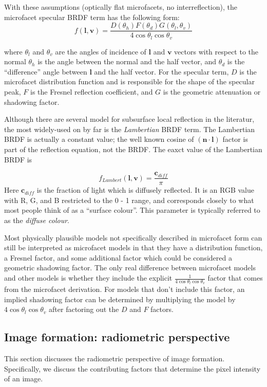 With these assumptions (optically flat microfacets, no interreflection), the microfacet specular BRDF term has the following form:
$$
f(\mathbf{l}, \mathbf{v}) = \frac{D(\theta_h)F(\theta_d)G(\theta_l, \theta_v)}{4\cos\theta_l\cos\theta_v}
$$

where $\theta_l$ and $\theta_v$ are the angles of incidence of $\mathbf{l}$ and $\mathbf{v}$ vectors with respect to the normal $\theta_h$ is the angle between the normal and the half vector, and $\theta_d$ is the ``difference'' angle between $\mathbf{l}$ and the half vector. For the specular term, $D$ is the microfacet distribution function and is responsible for the shape of the specular peak, $F$ is the Fresnel reflection coefficient, and $G$ is the geometric attenuation or shadowing factor.

Although there are several model for subsurface local reflection in the literatur, the most widely-used on by far is the \textit{Lambertian} BRDF term. The Lambertian BRDF is actually a constant value; the well known cosine of $(\mathbf{n}\cdot\mathbf{l})$ factor is part of the reflection equation, not the BRDF. The eaxct value of the Lambertian BRDF is

$$
f_{Lambert}(\mathbf{l}, \mathbf{v}) = \frac{\mathbf{c}_{diff}}{\pi}
$$
Here $\mathbf{c}_{diff}$ is the fraction of light which is diffusely reflected. It is an RGB value with R, G, and B restricted to the 0 - 1 range, and corresponds closely to what most people think of as a ``surface colour''. This parameter is typically referred to as the \textit{diffuse colour}.

Most physically plausible models not specifically described in microfacet form can still be interpreted as microfacet models in that they have a distribution function, a Fresnel factor, and some additional factor which could be considered a geometric shadowing factor. The only real difference
between microfacet models and other models is whether they include the explicit $\frac{1}{4\cos\theta_l\cos\theta_v}$ factor that comes from the microfacet derivation. For models that don’t include this factor, an implied shadowing factor can be determined by multiplying the model by $4\cos\theta_l\cos\theta_v$ after factoring out the $D$ and $F$ factors.

\subsection{Image formation: radiometric perspective}
This section discusses the radiometric perspective of image formation. Specifically, we discuss the contributing factors that determine the pixel intensity of an image.

